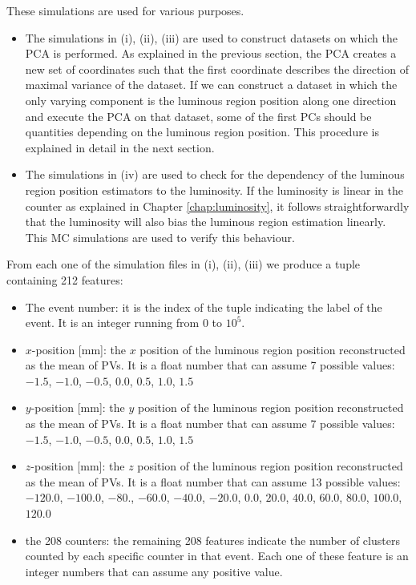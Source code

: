 These simulations are used for various purposes. 
\begin{itemize}
\item The simulations in (i), (ii), (iii) are used to construct datasets on which the PCA is performed. As explained in the previous section, the PCA creates a new set of coordinates such that the first coordinate describes the direction of maximal variance of the dataset. If we can construct a dataset in which the only varying component is the luminous region position along one direction and execute the PCA on that dataset, some of the first PCs should be quantities depending on the luminous region position. This procedure is explained in detail in the next section.
\item The simulations in (iv) are used to check for the dependency of the luminous region position estimators to the luminosity. If the luminosity is linear in the counter as explained in Chapter \ref{chap:luminosity}, it follows straightforwardly that the luminosity will also bias the luminous region estimation linearly. This MC simulations are used to verify this behaviour.
\end{itemize}

From each one of the simulation files in (i), (ii), (iii) we produce a tuple containing 212 features:
\begin{itemize}
    \item The event number: it is the index of the tuple indicating the label of the event. It is an integer running from $0$ to $10^5$.
    \item $x$-position [mm]: the $x$ position of the luminous region position reconstructed as the mean of PVs. It is a float number that can assume 7 possible values: $-1.5$, $-1.0$, $-0.5$, $0.0$, $0.5$, $1.0$, $1.5$
    \item $y$-position [mm]: the $y$ position of the luminous region position reconstructed as the mean of PVs. It is a float number that can assume 7 possible values: $-1.5$, $-1.0$, $-0.5$, $0.0$, $0.5$, $1.0$, $1.5$
    \item $z$-position [mm]: the $z$ position of the luminous region position reconstructed as the mean of PVs. It is a float number that can assume 13 possible values: \\
    $-120.0$, $-100.0$, $-80.$, $-60.0$, $-40.0$, $-20.0$, $0.0$, $20.0$, $40.0$, $60.0$, $80.0$, $100.0$, $120.0$
    \item the 208 counters: the remaining 208 features indicate the number of clusters counted by each specific counter in that event. Each one of these feature is an integer numbers that can assume any positive value.
\end{itemize}

